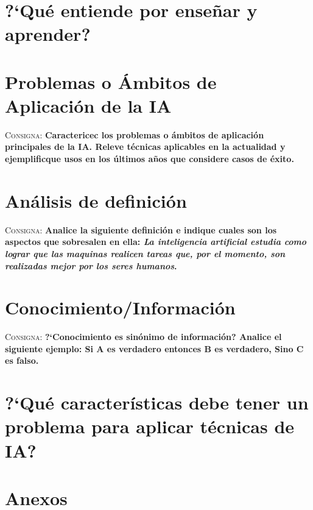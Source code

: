 \documentclass{article}
\begin{document}
\section{?`Qu\'e entiende por ense\~nar y aprender?}

\section{Problemas o \'Ambitos de Aplicaci\'on de la IA}
\textsc{Consigna}: \textbf{Caractericec los problemas o \'ambitos de aplicaci\'on principales de la IA. Releve t\'ecnicas aplicables en la actualidad y ejemplificque usos en los \'ultimos a\~nos que considere casos de \'exito.}

\section{An\'alisis de definici\'on}
\textsc{Consigna}: \textbf{Analice la siguiente definici\'on e indique cuales son los aspectos que sobresalen en ella: \textit{La inteligencia artificial estudia como lograr que las maquinas realicen tareas que, por el momento, son realizadas mejor por los seres humanos}.}

\section{Conocimiento/Informaci\'on}
\textsc{Consigna}: \textbf{?`Conocimiento es sin\'onimo de informaci\'on? Analice el siguiente ejemplo: Si A es verdadero entonces B es verdadero, Sino C es falso.}

\section{?`Qu\'e caracter\'isticas debe tener un problema para aplicar t\'ecnicas de IA?}


\section{Anexos}
\end{document}
